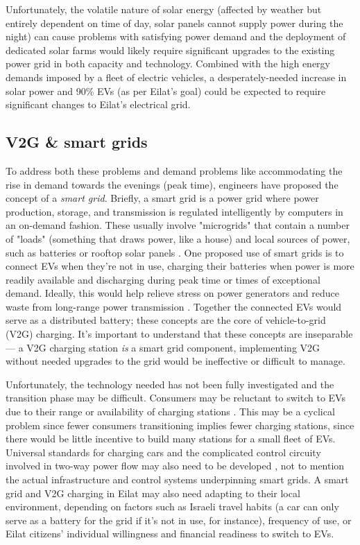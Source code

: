 \documentclass{report}                         %
\begin{document}
Unfortunately, the volatile nature of solar energy (affected by weather but entirely dependent on time of day, solar panels cannot supply power during the night) can cause problems with satisfying power demand \cite{Lu2015IntroductionPEVs} and the deployment of dedicated solar farms would likely require significant upgrades to the existing power grid \cite{Vardimon2011AssessmentIsrael} in both capacity and technology. Combined with the high energy demands imposed by a fleet of electric vehicles, a desperately-needed increase in solar power and 90\% EVs (as per Eilat's goal) could be expected to require significant changes to Eilat's electrical grid.

\subsection{V2G \& smart grids}
To address both these problems and demand problems like accommodating the rise in demand towards the evenings (peak time), engineers have proposed the concept of a \textit{smart grid}. Briefly, a smart grid is a power grid where power production, storage, and transmission is regulated intelligently by computers in an on-demand fashion. These usually involve "microgrids" that contain a number of "loads" (something that draws power, like a house) and local sources of power, such as batteries or rooftop solar panels \cite{Lu2015IntroductionPEVs}. One proposed use of smart grids is to connect EVs when they're not in use, charging their batteries when power is more readily available and discharging during peak time \cite{Mahmud2015PowerEV} or times of exceptional demand. Ideally, this would help relieve stress on power generators and reduce waste from long-range power transmission \cite{Zhu2015DistributedGrid}. Together the connected EVs would serve as a distributed battery; these concepts are the core of vehicle-to-grid (V2G) charging. It's important to understand that these concepts are inseparable --- a V2G charging station \textit{is} a smart grid component, implementing V2G without needed upgrades to the grid would be ineffective or difficult to manage.

Unfortunately, the technology needed has not been fully investigated and the transition phase may be difficult. Consumers may be reluctant to switch to EVs due to their range or availability of charging stations \cite{Zhu2015DistributedGrid}. This may be a cyclical problem since fewer consumers transitioning implies fewer charging stations, since there would be little incentive to build many stations for a small fleet of EVs. Universal standards for charging cars and the complicated control circuity involved in two-way power flow may also need to be developed \cite{Ustun2015ImpactSystems, Yeshayahou2011IsraelCharging}, not to mention the actual infrastructure and control systems underpinning smart grids. A smart grid and V2G charging in Eilat may also need adapting to their local environment, depending on factors such as Israeli travel habits (a car can only serve as a battery for the grid if it's not in use, for instance), frequency of use, or Eilat citizens' individual willingness and financial readiness to switch to EVs.
\end{document}

